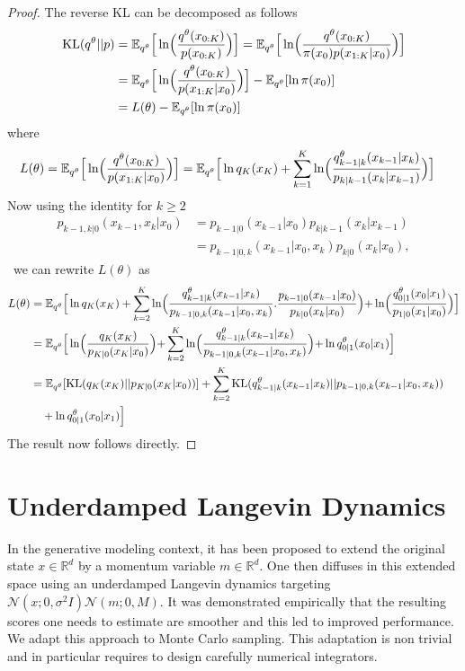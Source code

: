 \documentclass{article} %
\begin{document}
\begin{proof}
The reverse KL can be decomposed as follows
\begin{align*}
\KL(q^{\theta}||p)&=\mathbb{E}_{q^{\theta}}\Big[\log \Bigl(\frac{q^{\theta}(x_{0:K})}{p(x_{0:K})}\Bigl)\Big]=\mathbb{E}_{q^{\theta}}\Big[\log \Bigl(\frac{q^{\theta}(x_{0:K})}{\pi(x_0)p(x_{1:K}|x_0)}\Bigl)\Big]\\
&=\mathbb{E}_{q^{\theta}}\Big[\log \Bigl(\frac{q^{\theta}(x_{0:K})}{p(x_{1:K}|x_0)}\Bigl)\Big]-\mathbb{E}_{q^{\theta}}[\log \pi(x_0)]\\
&=L(\theta)-\mathbb{E}_{q^{\theta}}[\log \pi(x_0)]
\end{align*}
where
\begin{align*}
L(\theta)&=\mathbb{E}_{q^{\theta}}\Big[\log \Bigl(\frac{q^{\theta}(x_{0:K})}{p(x_{1:K}|x_0)}\Bigl)\Big]=\mathbb{E}_{q^{\theta}}\Big[\log q_K(x_K) +\sum_{k=1}^K
\log \Bigl(\frac{q^{\theta}_{k-1|k}(x_{k-1}|x_{k})}{p_{k|k-1}(x_{k}|x_{k-1})}\Bigl)\Big]
\end{align*}
Now using the identity for $k \geq 2$
\begin{align*}
    p_{k-1,k|0}(x_{k-1},x_k|x_0)&= p_{k-1|0}(x_{k-1}|x_0) p_{k|k-1}(x_k|x_{k-1})\\
    &=p_{k-1|0,k}(x_{k-1}|x_0,x_k)p_{k|0}(x_k|x_0),
\end{align*}\
we can rewrite $L(\theta)$ as
\begin{align*}
L(\theta)&=\mathbb{E}_{q^{\theta}}\Bigr[\log q_K(x_K) +\sum_{k=2}^{K}
\log \Bigl(\frac{q^{\theta}_{k-1|k}(x_{k-1}|x_{k})}{p_{k-1|0,k}(x_{k-1}|x_0,x_k)}.\frac{p_{k-1|0}(x_{k-1}|x_0)}{p_{k|0}(x_{k}|x_0)}\Bigl)+ \log \Bigl(\frac{q^{\theta}_{0|1}(x_0|x_1)}{p_{1|0}(x_1|x_0)}\Bigl) \Bigr]\\
&=\mathbb{E}_{q^{\theta}}\Big[\log \Bigl(\frac{q_K(x_K)}{p_{K|0}(x_{K}|x_0)}\Bigl) +\sum_{k=2}^{K}
\log  \Bigl(\frac{q^{\theta}_{k-1|k}(x_{k-1}|x_{k})}{p_{k-1|0,k}(x_{k-1}|x_0,x_k)} \Bigl)+ \log q^{\theta}_{0|1}(x_0|x_1) \Big]\\
&=\mathbb{E}_{q^{\theta}}[\KL(q_K(x_K)||p_{K|0}(x_K|x_0))]
+\sum_{k=2}^{K} \KL(q^{\theta}_{k-1|k}(x_{k-1}|x_k)||p_{k-1|0,k}(x_{k-1}|x_0,x_k))\\
&\quad + \log q^{\theta}_{0|1}(x_0|x_1) \Big]
\end{align*}
The result now follows directly. 
\end{proof}

\section{Underdamped Langevin Dynamics}\label{sec:underdampeddetailsSM}
In the generative modeling context, it has been proposed to extend the original state $x \in \mathbb{R}^d$ by a momentum variable $m \in \mathbb{R}^d$. One then diffuses in this extended space using an underdamped Langevin dynamics \citep{Dockhorn2022} targeting $\mathcal{N}(x;0,\sigma^2I)\mathcal{N}(m;0,M)$. It was demonstrated empirically that the resulting scores one needs to estimate are smoother and this led to improved performance. We adapt this approach to Monte Carlo sampling. This adaptation is non trivial and in particular requires to design carefully numerical integrators.
\end{document}
